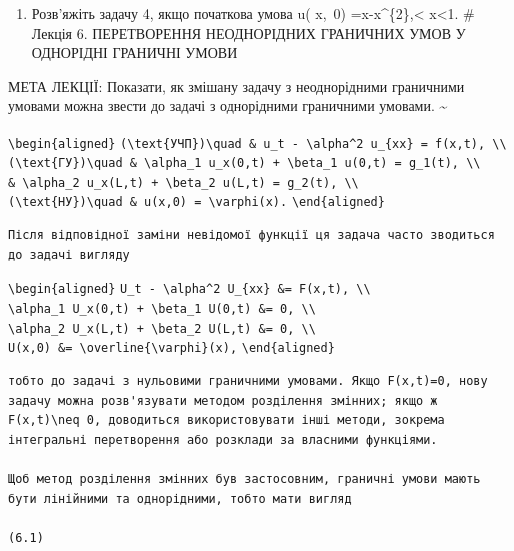 \documentclass[
  ukrainian,
]{article}
\providecommand{\tightlist}{%
  \setlength{\itemsep}{0pt}\setlength{\parskip}{0pt}}
\begin{document}
\begin{enumerate}
\def\labelenumi{\arabic{enumi}.}
\setcounter{enumi}{5}
\tightlist
\item
  Розв'яжіть задачу 4, якщо початкова умова u\left( x,~0\right)
  =x-x\^{}\{2\},\textless{} x\textless1. \# Лекція 6.
  ПЕРЕТВОРЕННЯ НЕОДНОРІДНИХ ГРАНИЧНИХ УМОВ У ОДНОРІДНІ ГРАНИЧНІ УМОВИ
\end{enumerate}

МЕТА ЛЕКЦІЇ: Показати, як змішану задачу з неоднорідними граничними
умовами можна звести до задачі з однорідними граничними умовами.
\textsubscript{}\textasciitilde{}

\texttt{\textbackslash{}begin\{aligned\}}
\texttt{(\textbackslash{}text\{УЧП\})\textbackslash{}quad\ \&\ u\_t\ -\ \textbackslash{}alpha\^{}2\ u\_\{xx\}\ =\ f(x,t),\ \textbackslash{}\textbackslash{}}
\texttt{(\textbackslash{}text\{ГУ\})\textbackslash{}quad\ \&\ \textbackslash{}alpha\_1\ u\_x(0,t)\ +\ \textbackslash{}beta\_1\ u(0,t)\ =\ g\_1(t),\ \textbackslash{}\textbackslash{}}
\texttt{\&\ \textbackslash{}alpha\_2\ u\_x(L,t)\ +\ \textbackslash{}beta\_2\ u(L,t)\ =\ g\_2(t),\ \textbackslash{}\textbackslash{}}
\texttt{(\textbackslash{}text\{НУ\})\textbackslash{}quad\ \&\ u(x,0)\ =\ \textbackslash{}varphi(x).}
\texttt{\textbackslash{}end\{aligned\}}

\begin{verbatim}
Після відповідної заміни невідомої функції ця задача часто зводиться до задачі вигляду
\end{verbatim}

\texttt{\textbackslash{}begin\{aligned\}}
\texttt{U\_t\ -\ \textbackslash{}alpha\^{}2\ U\_\{xx\}\ \&=\ F(x,t),\ \textbackslash{}\textbackslash{}}
\texttt{\textbackslash{}alpha\_1\ U\_x(0,t)\ +\ \textbackslash{}beta\_1\ U(0,t)\ \&=\ 0,\ \textbackslash{}\textbackslash{}}
\texttt{\textbackslash{}alpha\_2\ U\_x(L,t)\ +\ \textbackslash{}beta\_2\ U(L,t)\ \&=\ 0,\ \textbackslash{}\textbackslash{}}
\texttt{U(x,0)\ \&=\ \textbackslash{}overline\{\textbackslash{}varphi\}(x),}
\texttt{\textbackslash{}end\{aligned\}}

\begin{verbatim}
тобто до задачі з нульовими граничними умовами. Якщо F(x,t)=0, нову задачу можна розв'язувати методом розділення змінних; якщо ж F(x,t)\neq 0, доводиться використовувати інші методи, зокрема інтегральні перетворення або розклади за власними функціями.

Щоб метод розділення змінних був застосовним, граничні умови мають бути лінійними та однорідними, тобто мати вигляд

(6.1)
\end{verbatim}
\end{document}
